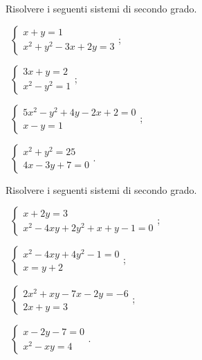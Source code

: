 \begin{esercizio}[\Ast]
 \label{ese:6.6}
Risolvere i seguenti sistemi di secondo grado.
\begin{multicols}{2}
 \begin{enumeratea}
 \item~$\left\{\begin{array}{l}x+y=1\\x^2+y^2-3x+2y=3\end{array}\right.$;
 \item~$\left\{\begin{array}{l}3x+y=2\\x^2-y^2=1\end{array}\right.$;
 \item~$\left\{\begin{array}{l}5x^2-y^2+4y-2x+2=0\\x-y=1\end{array}\right.$;
 \item~$\left\{\begin{array}{l}x^2+y^2=25\\4x-3y+7=0\end{array}\right.$.
 \end{enumeratea}
 \end{multicols}
\end{esercizio}
\pagebreak
\begin{esercizio}[\Ast]
\label{ese:6.7}
Risolvere i seguenti sistemi di secondo grado.
\begin{multicols}{2}
 \begin{enumeratea}
 \item~$\left\{\begin{array}{l}x+2y=3\\x^2-4xy+2y^2+x+y-1=0\end{array}\right.$;
 \item~$\left\{\begin{array}{l}x^2-4xy+4y^2-1=0\\x=y+2\end{array}\right.$;
 \item~$\left\{\begin{array}{l}2x^2+xy-7x-2y=-6\\2x+y=3\end{array}\right.$;
 \item~$\left\{\begin{array}{l}x-2y-7=0\\x^2-xy=4\end{array}\right.$.
 \end{enumeratea}
 \end{multicols}
\end{esercizio}

